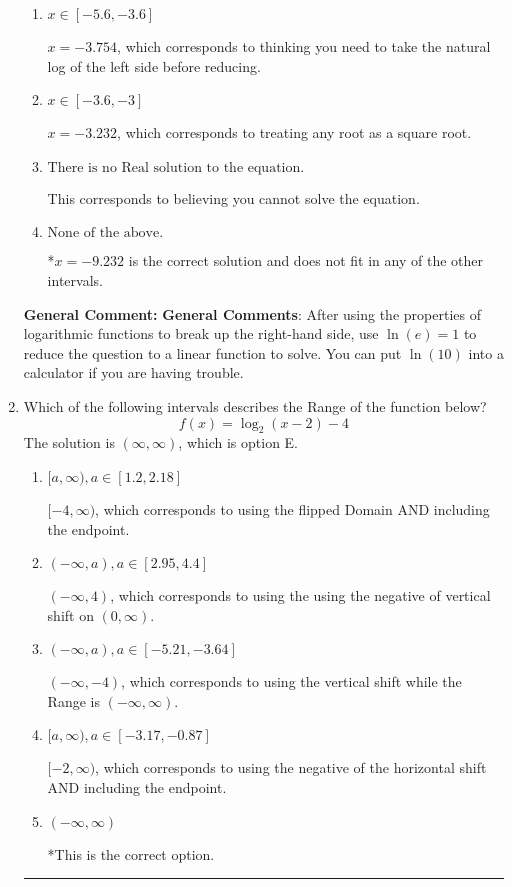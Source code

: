 \documentclass{extbook}[14pt]
\newcommand{\litem}[1]{\item #1

\rule{\textwidth}{0.4pt}}
\begin{document}
\begin{enumerate}
{\begin{enumerate}[label=\Alph*.]
$x = 9.232$, which is the negative of the correct solution.
\item \( x \in [-5.6, -3.6] \)

$x = -3.754$, which corresponds to thinking you need to take the natural log of the left side before reducing.
\item \( x \in [-3.6, -3] \)

$x = -3.232$, which corresponds to treating any root as a square root.
\item \( \text{There is no Real solution to the equation.} \)

This corresponds to believing you cannot solve the equation.
\item \( \text{None of the above.} \)

*$x = -9.232$ is the correct solution and does not fit in any of the other intervals.
\end{enumerate}

\textbf{General Comment:} \textbf{General Comments}: After using the properties of logarithmic functions to break up the right-hand side, use $\ln(e) = 1$ to reduce the question to a linear function to solve. You can put $\ln(10)$ into a calculator if you are having trouble.
}
\litem{
Which of the following intervals describes the Range of the function below?
\[ f(x) = \log_2{(x-2)}-4 \]The solution is \( (\infty, \infty) \), which is option E.\begin{enumerate}[label=\Alph*.]
\item \( [a, \infty), a \in [1.2, 2.18] \)

$[-4, \infty)$, which corresponds to using the flipped Domain AND including the endpoint.
\item \( (-\infty, a), a \in [2.95, 4.4] \)

$(-\infty, 4)$, which corresponds to using the using the negative of vertical shift on $(0, \infty)$.
\item \( (-\infty, a), a \in [-5.21, -3.64] \)

$(-\infty, -4)$, which corresponds to using the vertical shift while the Range is $(-\infty, \infty)$.
\item \( [a, \infty), a \in [-3.17, -0.87] \)

$[-2, \infty)$, which corresponds to using the negative of the horizontal shift AND including the endpoint.
\item \( (-\infty, \infty) \)

*This is the correct option.
\end{enumerate}

}
\end{enumerate}
\end{document}
